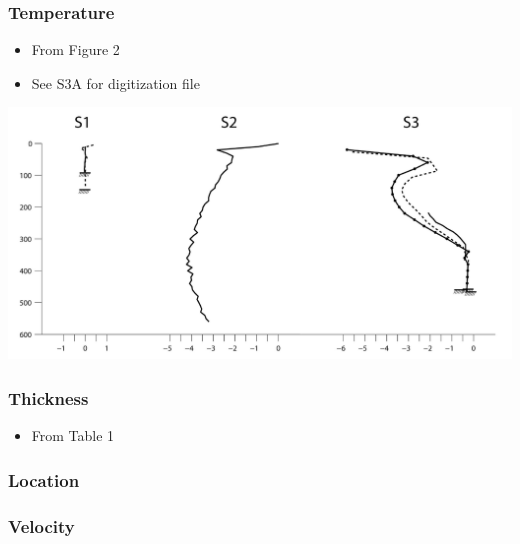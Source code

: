 \documentclass[article,a4paper,times,11pt,twoside]{article}
\begin{document}
\subsubsection{Temperature}
\label{sec:org01ed80e}

\begin{itemize}
\item From \textcite{harrington_2015} Figure 2
\item See S3A for digitization file
\end{itemize}

\begin{center}
\includegraphics[width=.9\linewidth]{h2015_s3c/harrington_2015_fig2_S1_S2_S3.png}
\end{center}

\subsubsection{Thickness}
\label{sec:org9470bec}

\begin{itemize}
\item From \textcite{harrington_2015} Table 1
\end{itemize}

\subsubsection{Location}
\label{sec:orge8d0318}

\subsubsection{Velocity}
\label{sec:orgcd32820}
\clearpage
\end{document}
